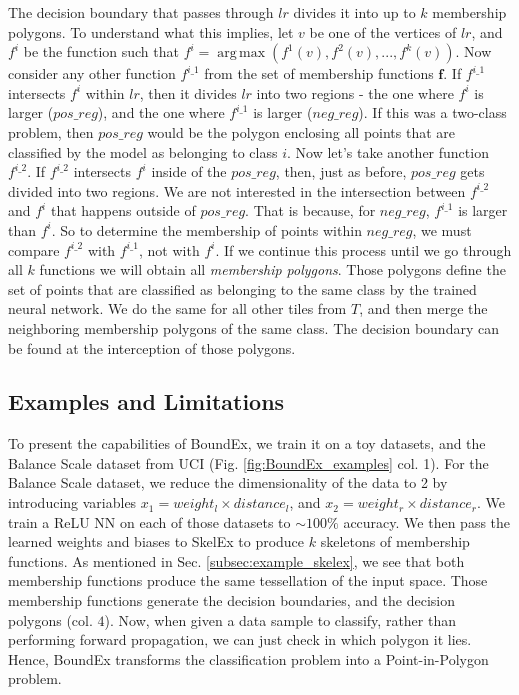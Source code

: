 \documentclass{article}
\DeclareMathOperator*{\argmax}{arg\,max}
\begin{document}
The decision boundary that passes through $lr$ divides it into up to $k$ membership polygons. To understand what this implies, let $v$ be one of the vertices of $lr$, and $f^i$ be the function such that $f^i = \argmax(f^1(v), f^2(v), ..., f^k(v))$. Now consider any other function $f^{i\_1}$ from the set of membership functions $\mathbf{f}$. If $f^{i\_1}$ intersects $f^i$ within $lr$, then it divides $lr$ into two regions - the one where $f^i$ is larger ($pos\_reg$), and the one where $f^{i\_1}$ is larger ($neg\_reg$). If this was a two-class problem, then $pos\_reg$ would be the polygon enclosing all points that are classified by the model as belonging to class $i$. Now let's take another function $f^{i\_2}$. If $f^{i\_2}$ intersects $f^i$ inside of the $pos\_reg$, then, just as before, $pos\_reg$ gets divided into two regions. We are not interested in the intersection between $f^{i\_2}$ and $f^i$ that happens outside of $pos\_reg$. That is because, for $neg\_reg$, $f^{i\_1}$ is larger than $f^i$. So to determine the membership of points within $neg\_reg$, we must compare $f^{i\_2}$ with $f^{i\_1}$, not with $f^i$. If we continue this process until we go through all $k$ functions we will obtain all \textit{membership polygons}. Those polygons define the set of points that are classified as belonging to the same class by the trained neural network. We do the same for all other tiles from $T$, and then merge the neighboring membership polygons of the same class. The decision boundary can be found at the interception of those polygons.

\subsection{Examples and Limitations}
\label{subsec:1}

To present the capabilities of BoundEx, we train it on a toy datasets, and the Balance Scale dataset from UCI \cite{Dua:2019} (Fig. \ref{fig:BoundEx_examples} col. 1). For the Balance Scale dataset, we reduce the dimensionality of the data to 2 by introducing variables $x_1 = weight_l \times distance_l$, and $x_2 = weight_r \times distance_r$. We train a ReLU NN on each of those datasets to $\sim100\%$ accuracy. We then pass the learned weights and biases to SkelEx to produce $k$ skeletons of membership functions. As mentioned in Sec. \ref{subsec:example_skelex}, we see that both membership functions produce the same tessellation of the input space. Those membership functions generate the decision boundaries, and the decision polygons (col. $4$). Now, when given a data sample to classify, rather than performing forward propagation, we can just check in which polygon it lies. Hence, BoundEx transforms the classification problem into a Point-in-Polygon problem.
\end{document}

